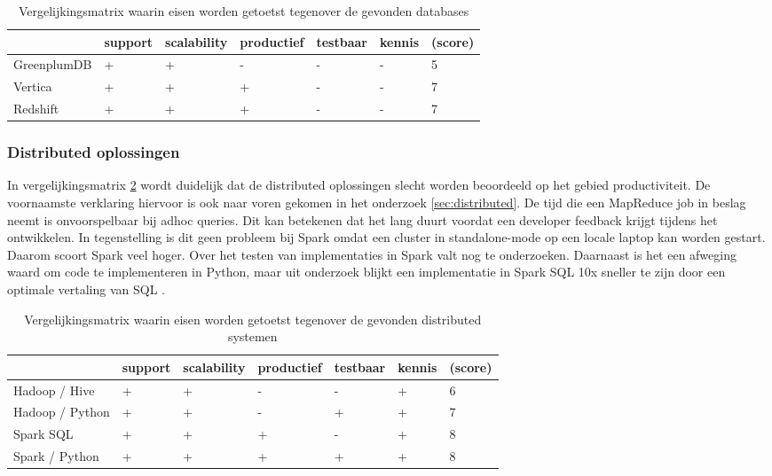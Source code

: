 \begin{table}[bh]
\caption{Vergelijkingsmatrix waarin eisen worden getoetst tegenover de gevonden databases}
\label{tab:matrix_databases}
\begin{tabular}{|p{3cm}|l|l|l|l|l|l|}
\hline
           & support & scalability               & productief & testbaar & kennis &     (score)  \\ \hline
GreenplumDB & +       & +                         & -          & -        & -      & 5     \\ \hline
Vertica     & +       & +                         & +          & -        & -      & 7     \\ \hline
Redshift    & +       & +                         & +          & -        & -      & 7     \\ \hline
\end{tabular}
\end{table}

\subsubsection{\textbf{Distributed oplossingen}}

In vergelijkingsmatrix \ref{tab:matrix_distributed} wordt duidelijk dat de distributed oplossingen slecht worden beoordeeld op het gebied productiviteit. De voornaamste verklaring hiervoor is ook naar voren gekomen in het onderzoek \ref{sec:distributed}. De tijd die een MapReduce job in beslag neemt is onvoorspelbaar bij adhoc queries. Dit kan betekenen dat het lang duurt voordat een developer feedback krijgt tijdens het ontwikkelen. In tegenstelling is dit geen probleem bij Spark omdat een cluster in standalone-mode op een locale laptop kan worden gestart. Daarom scoort Spark veel hoger. Over het testen van implementaties in Spark valt nog te onderzoeken. Daarnaast is het een afweging waard om code te implementeren in Python, maar uit onderzoek blijkt een implementatie in Spark SQL 10x sneller te zijn door een optimale vertaling van SQL \parencite{armbrust2015spark}.

\begin{table}[bh]
\caption{Vergelijkingsmatrix waarin eisen worden getoetst tegenover de gevonden distributed systemen}
\label{tab:matrix_distributed}
\begin{tabular}{|p{3cm}|l|l|l|l|l|l|}
\hline
                & support & scalability               & productief & testbaar & kennis &     (score)  \\ \hline
Hadoop / Hive   & +       & +                         & -          & -        & +      & 6     \\ \hline
Hadoop / Python & +       & +                         & -          & +        & +      & 7     \\ \hline
Spark SQL       & +       & +                         & +          & -        & +      & 8     \\ \hline
Spark / Python  & +       & +                        & +          & +        & +      & 8     \\ \hline
\end{tabular}
\end{table}

